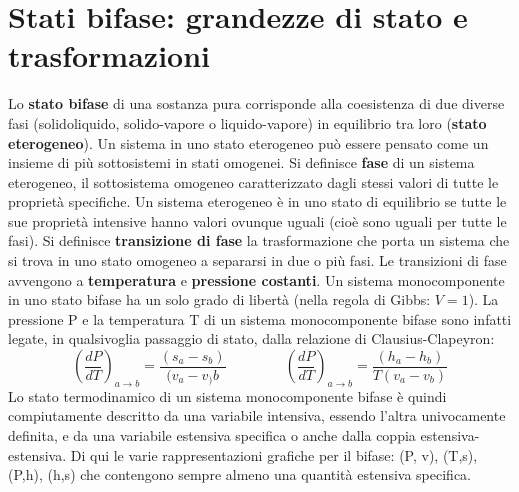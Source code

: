 \section{Stati bifase: grandezze di stato e trasformazioni}
Lo \textbf{stato bifase} di una sostanza pura corrisponde alla coesistenza di due diverse fasi (solidoliquido, solido-vapore o liquido-vapore) in equilibrio tra loro (\textbf{stato eterogeneo}). Un sistema
in uno stato eterogeneo può essere pensato come un insieme di più sottosistemi in stati
omogenei. Si definisce \textbf{fase} di un sistema eterogeneo, il sottosistema omogeneo caratterizzato
dagli stessi valori di tutte le proprietà specifiche. Un sistema eterogeneo è in uno stato di
equilibrio se tutte le sue proprietà intensive hanno valori ovunque uguali (cioè sono uguali
per tutte le fasi). \newline
\newline
Si definisce \textbf{transizione di fase} la trasformazione che porta un sistema che si trova in uno
stato omogeneo a separarsi in due o più fasi. Le transizioni di fase avvengono a \textbf{temperatura} e \textbf{pressione costanti}.\newline
\newline
Un sistema monocomponente in uno stato bifase
ha un solo grado di libertà (nella regola di Gibbs: $V=1$). \newline
\newline
La pressione P e la temperatura T di un sistema monocomponente bifase sono infatti legate,
in qualsivoglia passaggio di stato, dalla relazione di Clausius-Clapeyron: 
\[
    \left(\frac{dP}{dT}\right)_{a \rightarrow b} = \frac{(s_a-s_b)}{(v_a-v_)b} \;\;\;\;\;\;\;\;\;\;\;\;\;\;\; \left( \frac{dP}{dT} \right)_{a \rightarrow  b} = \frac{(h_a-h_b)}{T(v_a-v_b)}
\]
Lo stato termodinamico di un sistema monocomponente bifase è quindi compiutamente
descritto da una variabile intensiva, essendo l'altra univocamente definita, e da una variabile
estensiva specifica o anche dalla coppia estensiva-estensiva. \newline
\newline
Di qui le varie rappresentazioni grafiche per il bifase: (P, v), (T,s), (P,h), (h,s) che contengono
sempre almeno una quantità estensiva specifica. 
